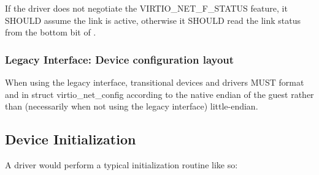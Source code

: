 If the driver does not negotiate the VIRTIO_NET_F_STATUS feature, it SHOULD
assume the link is active, otherwise it SHOULD read the link status from
the bottom bit of .

\subsubsection{Legacy Interface: Device configuration layout}\label{sec:Device Types / Network Device / Device configuration layout / Legacy Interface: Device configuration layout}
When using the legacy interface, transitional devices and drivers
MUST format  and
 in struct virtio_net_config
according to the native endian of the guest rather than
(necessarily when not using the legacy interface) little-endian.


\subsection{Device Initialization}\label{sec:Device Types / Network Device / Device Initialization}

A driver would perform a typical initialization routine like so:

